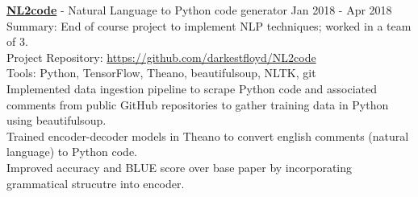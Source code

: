 \documentclass[a4paper]{article}
\newcommand{\mybullet}{
	\indent 
  \textbullet \hspace*{2mm}
}
\begin{document}
			\noindent
      \textbf{\href{https://github.com/darkestfloyd/NL2code}{NL2code}} - Natural Language to 
      Python code generator \hfill Jan 2018 - Apr 2018 \\
      Summary: End of course project to implement NLP techniques; worked in a team of 3. \\
      \hfill Project Repository: \href{https://github.com/darkestfloyd/NL2code}{https://github.com/darkestfloyd/NL2code}\\
      Tools: Python, TensorFlow, Theano, beautifulsoup, NLTK, git \\
      \mybullet Implemented data ingestion pipeline to scrape Python code and associated comments from public GitHub repositories 
      \hspace*{10mm}to gather training data in Python using beautifulsoup. \\
      \mybullet Trained encoder-decoder models in Theano to convert english comments (natural language) to Python code. \\
      \mybullet Improved accuracy and BLUE score over base paper by incorporating grammatical strucutre into encoder. \\

			
\end{document}
